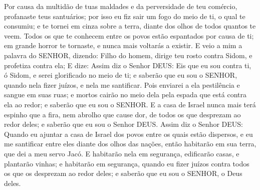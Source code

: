 {  Por causa da multidão de tuas maldades e da perversidade de teu comércio, profanaste teus santuários; por isso eu fiz sair um fogo do meio de ti, o qual te consumiu; e te tornei em cinza sobre a terra, diante dos olhos de todos quantos te veem.
  Todos os que te conhecem entre os povos estão espantados por causa de ti; em grande horror te tornaste, e nunca mais voltarás a existir.
  E veio a mim a palavra do SENHOR, dizendo:
  Filho do homem, dirige teu rosto contra Sidom, e profetiza contra ela;
  E dize: Assim diz o Senhor DEUS: Eis que eu sou contra ti, ó Sidom, e serei glorificado no meio de ti; e saberão que eu sou o SENHOR, quando nela fizer juízos, e nela me santificar.
  Pois enviarei a ela pestilência e sangue em suas ruas; e mortos cairão no meio dela pela espada que está contra ela ao redor; e saberão que eu sou o SENHOR.
  E a casa de Israel nunca mais terá espinho que a fira, nem abrolho que cause dor, de todos os que desprezam ao redor deles; e saberão que eu sou o Senhor DEUS.
  Assim diz o Senhor DEUS: Quando eu ajuntar a casa de Israel dos povos entre os quais estão dispersos, e eu me santificar entre eles diante dos olhos das nações, então habitarão em sua terra, que dei a meu servo Jacó.
  E habitarão nela em segurança, edificarão casas, e plantarão vinhas; e habitarão em segurança, quando eu fizer juízos contra todos os que os desprezam ao redor deles; e saberão que eu sou o SENHOR, o Deus deles.
\par }

